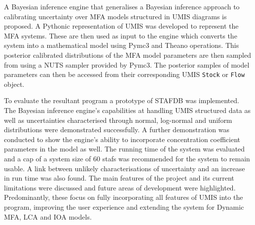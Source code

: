 \documentclass[ %
                    author={Tom Jager},
                supervisor={Dr. Daniel Schien},
                    degree={MEng},
                     title={A Bayesian Inference Engine for Calibrating Uncertainty over UMIS Structured MFA Systems},
                  subtitle={},
                      type={research},
                      year={2019} ]{dissertation}
\begin{document}
A Bayesian inference engine that generalises a Bayesian inference approach to calibrating uncertainty over MFA models structured in UMIS diagrams is proposed. A Pythonic representation of UMIS was developed to represent the MFA systems. These are then used as input to the engine which converts the system into a mathematical model using Pymc3 and Theano operations. This posterior calibrated distributions of the MFA model parameters are then sampled from using a NUTS sampler provided by Pymc3. The posterior samples of model parameters can then be accessed from their corresponding UMIS \texttt{Stock} or \texttt{Flow} object.

To evaluate the resultant program a prototype of STAFDB was implemented. The Bayesian inference engine's capabilities at handling UMIS structured data as well as uncertainties characterised through normal, log-normal and uniform distributions were demonstrated successfully. A further demonstration was conducted to show the engine's ability to incorporate concentration coefficient parameters in the model as well. The running time of the system was evaluated and a cap of a system size of $60$ stafs was recommended for the system to remain usable. A link between unlikely characterisations of uncertainty and an increase in run time was also found. The main features of the project and its current limitations were discussed and future areas of development were highlighted. Predominantly, these focus on fully incorporating all features of UMIS into the program, improving the user experience and extending the system for Dynamic MFA, LCA and IOA models.
\end{document}
